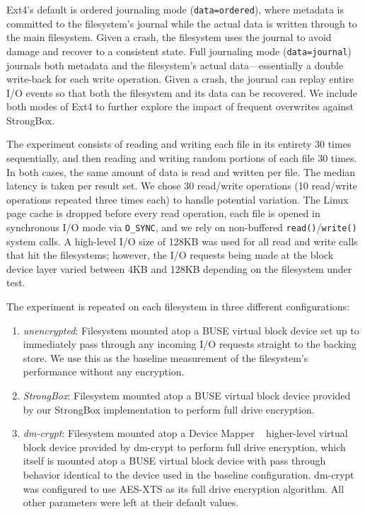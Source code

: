 Ext4's default is ordered journaling mode (\texttt{data=ordered}),
where metadata is committed to the filesystem's journal while the
actual data is written through to the main filesystem. Given a crash,
the filesystem uses the journal to avoid damage and recover to a
consistent state. Full journaling mode (\texttt{data=journal})
journals both metadata and the filesystem's actual data---essentially
a double write-back for each write operation. Given a crash, the
journal can replay entire I/O events so that both the filesystem and
its data can be recovered. We include both modes of Ext4 to further
explore the impact of frequent overwrites against StrongBox.

The experiment consists of reading and writing each file in its
entirety 30 times sequentially, and then reading and writing random
portions of each file 30 times. In both cases, the same amount of data
is read and written per file. The median latency is taken per result
set. We chose 30 read/write operations (10 read/write operations
repeated three times each) to handle potential variation. The Linux
page cache is dropped before every read operation, each file is
opened in synchronous I/O mode via \texttt{O\_SYNC}, and we rely on
non-buffered \texttt{read()}/\texttt{write()} system calls. A
high-level I/O size of 128KB was used for all read and write calls
that hit the filesystems; however, the I/O requests being made at the
block device layer varied between 4KB and 128KB depending on the
filesystem under test.

The experiment is repeated on each filesystem in three different
configurations:
\begin{enumerate}
\item \textit{unencrypted}: Filesystem mounted atop a BUSE virtual block
  device set up to immediately pass through any incoming I/O requests straight
  to the backing store. We use this as the baseline measurement of the
  filesystem's performance without any encryption.
\item \textit{StrongBox}: Filesystem mounted atop a BUSE virtual block
  device provided by our StrongBox implementation to perform full drive
  encryption.
\item \textit{dm-crypt}: Filesystem mounted atop a Device Mapper
 ~\cite{LinuxDeviceMapper} higher-level virtual block device provided by
  dm-crypt to perform full drive encryption, which itself is mounted atop a
  BUSE virtual block device with pass through behavior identical to the device
  used in the baseline configuration. dm-crypt was configured to use AES-XTS as
  its full drive encryption algorithm. All other parameters were left at their
  default values.
\end{enumerate}

